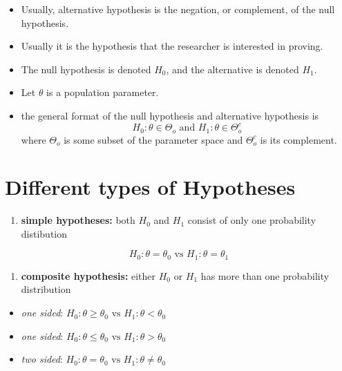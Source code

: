 \documentclass[]{book}
\providecommand{\tightlist}{%
  \setlength{\itemsep}{0pt}\setlength{\parskip}{0pt}}
\begin{document}
\begin{itemize}
\item
  Usually, alternative hypothesis is the negation, or complement, of the null hypothesis.
\item
  Usually it is the hypothesis that the researcher is interested in proving.
\item
  The null hypothesis is denoted \(H_0\), and the alternative is denoted \(H_1\).
\item
  Let \(\theta\) is a population parameter.
\item
  the general format of the null hypothesis and alternative hypothesis is
  \[H_0 : \theta \in \Theta_o \text{ and } H_1 :\theta \in \Theta_o^c\]
  where \(\Theta_o\) is some subset of the parameter space and \(\Theta_o^c\) is its complement.
\end{itemize}

\hypertarget{different-types-of-hypotheses}{%
\section{Different types of Hypotheses}\label{different-types-of-hypotheses}}

\begin{enumerate}
\def\labelenumi{(\arabic{enumi})}
\tightlist
\item
  \textbf{simple hypotheses:} both \(H_0\) and \(H_1\) consist of only one probability distibution
\end{enumerate}

\[H_0: \theta = \theta_0 \text{ vs } H_1: \theta = \theta_1\]

\begin{enumerate}
\def\labelenumi{(\arabic{enumi})}
\setcounter{enumi}{1}
\tightlist
\item
  \textbf{composite hypothesis:} either \(H_0\) or \(H_1\) has more than one probability distribution
\end{enumerate}

\begin{itemize}
\tightlist
\item
  \emph{one sided}: \(H_0: \theta \geq \theta_0 \text{ vs } H_1: \theta < \theta_0\)
\item
  \emph{one sided}: \(H_0: \theta \leq \theta_0 \text{ vs } H_1: \theta > \theta_0\)
\item
  \emph{two sided}: \(H_0: \theta = \theta_0 \text{ vs } H_1: \theta \neq \theta_0\)
\end{itemize}
\end{document}
